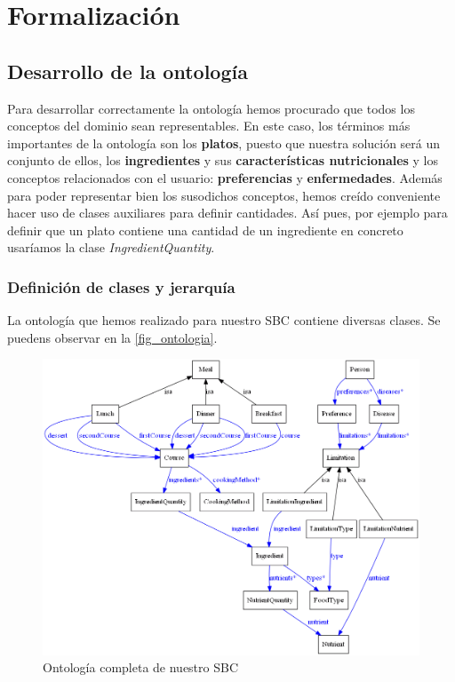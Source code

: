 \documentclass[12]{article}
\begin{document}
\section{Formalización}

\subsection{Desarrollo de la ontología}
Para desarrollar correctamente la ontología hemos procurado que todos los conceptos del dominio sean representables. En este caso, los términos más importantes de la ontología son los \textbf{platos}, puesto que nuestra solución será un conjunto de ellos, los \textbf{ingredientes} y sus \textbf{características nutricionales} y los conceptos relacionados con el usuario: \textbf{preferencias} y \textbf{enfermedades}. Además para poder representar bien los susodichos conceptos, hemos creído conveniente hacer uso de clases auxiliares para definir cantidades. Así pues, por ejemplo para definir que un plato contiene una cantidad de un ingrediente en concreto usaríamos la clase \textit{IngredientQuantity}.
\label{ontologia_apartado}
\subsubsection{Definición de clases y jerarquía}

La ontología que hemos realizado para nuestro SBC contiene diversas clases. Se puedens observar en la \autoref{fig_ontologia}.

\begin{figure}[H]
\centering
\includegraphics[width=\textwidth,height=\textheight,keepaspectratio]{images/full_light.png}
\caption{Ontología completa de nuestro SBC}
\label{fig_ontologia}
\end{figure}
\end{document}
